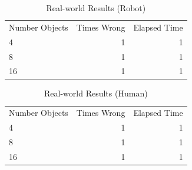 \documentclass[graybox]{svmult}
\begin{document}
\begin{table}
\caption{Real-world Results (Robot)\label{table:real_results_robot}}
\centering
\begin{tabular}{lrr}
\toprule
Number Objects & Times Wrong & Elapsed Time\\
4 &  1 & 1\\
8  &  1 & 1\\
16 &  1 & 1\\
\bottomrule
\end{tabular}
\end{table}
\begin{table}
\caption{Real-world Results (Human)\label{table:real_results_human}}
\centering
\begin{tabular}{lrr}
\toprule
Number Objects & Times Wrong & Elapsed Time\\
4 &  1 & 1\\
8  &  1 & 1\\
16 &  1 & 1\\
\bottomrule
\end{tabular}
\end{table}
\end{document}
